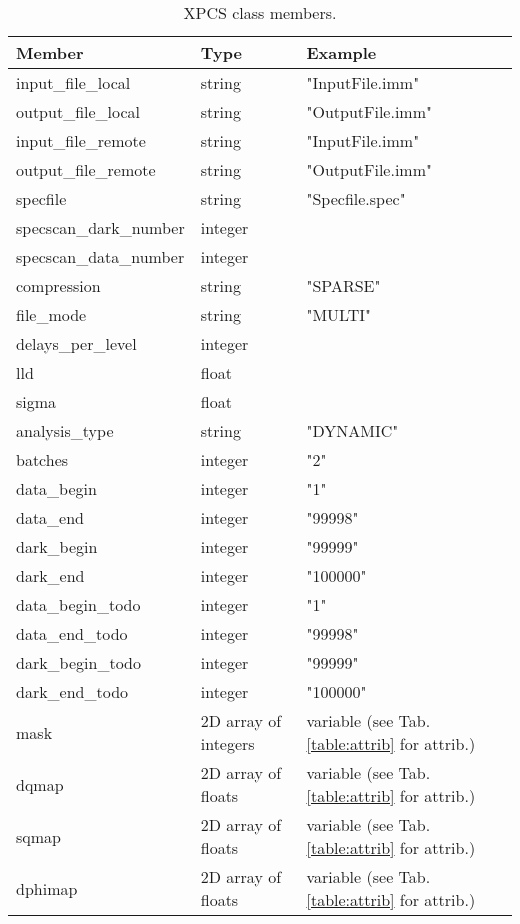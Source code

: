 \begin{table}[h!]\sffamily \footnotesize
\caption{XPCS class members.}

\begin{tabular}{p{3.5cm} p{4.0cm}  p{4.5cm} }

\toprule
\bfseries Member     & \bfseries Type & \bfseries Example \\
\midrule
input\_file\_local &  string & "InputFile.imm" \\
output\_file\_local &  string & "OutputFile.imm" \\
input\_file\_remote &  string & "InputFile.imm" \\
output\_file\_remote &  string & "OutputFile.imm" \\
specfile & string & "Specfile.spec" \\
specscan\_dark\_number & integer & \\
specscan\_data\_number & integer & \\
compression & string & "SPARSE" \\
file\_mode & string & "MULTI" \\
delays\_per\_level & integer & \\
lld & float & \\
sigma & float & \\
analysis\_type & string & "DYNAMIC" \\
batches & integer & "2" \\
data\_begin & integer & "1" \\
data\_end & integer & "99998" \\
dark\_begin & integer & "99999" \\
dark\_end & integer & "100000" \\
data\_begin\_todo & integer & "1" \\
data\_end\_todo & integer & "99998" \\
dark\_begin\_todo & integer & "99999" \\
dark\_end\_todo & integer & "100000" \\
mask & 2D array of integers & variable (see Tab. \ref{table:attrib} for attrib.)  \\
dqmap & 2D array of floats & variable (see Tab. \ref{table:attrib} for attrib.)  \\
sqmap & 2D array of floats & variable (see Tab. \ref{table:attrib} for attrib.)  \\
dphimap & 2D array of floats & variable (see Tab. \ref{table:attrib} for attrib.)  \\

\end{tabular}
\end{table}
